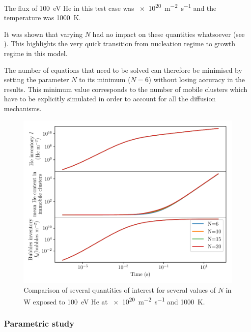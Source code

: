 The flux of \SI{100}{eV} He in this test case was \SI{e20}{m^{-2} s^{-1}} and the temperature was \SI{1000}{K}. 

It was shown that varying $N$ had no impact on these quantities whatsoever (see ).
This highlights the very quick transition from nucleation regime to growth regime in this model.

The number of equations that need to be solved can therefore be minimised by setting the parameter $N$ to its minimum ($N=6$) without losing accuracy in the results.
This minimum value corresponds to the number of mobile clusters which have to be explicitly simulated in order to account for all the diffusion mechanisms.

\begin{figure} [h]
    \centering
    \includegraphics[width=\linewidth]{Figures/Chapter4/varying_N.pdf}
    \caption{Comparison of several quantities of interest for several values of $N$ in W exposed to \SI{100}{eV} He at \SI{e20}{m^{-2}.s^{-1}} and \SI{1000}{K}.}
\end{figure}


\subsubsection{Parametric study} 

